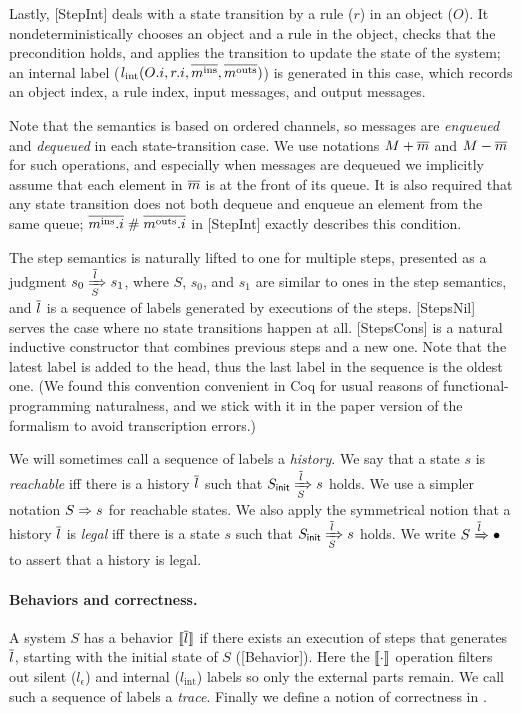 \documentclass[sigplan,10pt,review,anonymous,screen]{acmart}\settopmatter{printfolios=true,printccs=false,printacmref=false}
\begin{document}
Lastly, [StepInt] deals with a state transition by a rule ($r$) in an object ($O$).
It nondeterministically chooses an object and a rule in the object, checks that the precondition holds, and applies the transition to update the state of the system; an internal label ($\lblInt{\idxOf{O}}{\idxOf{r}}{\msgIns{m}}{\msgOuts{m}}$) is generated in this case, which records an object index, a rule index, input messages, and output messages.

Note that the semantics is based on ordered channels, so messages are \emph{enqueued} and \emph{dequeued} in each state-transition case.
We use notations $\enqMsgs{M}{\listof{m}}$ and $\deqMsgs{M}{\listof{m}}$ for such operations, and especially when messages are dequeued we implicitly assume that each element in $\listof{m}$ is at the front of its queue.
It is also required that any state transition does not both dequeue and enqueue an element from the same queue; $\disj{\midxIns{m}}{\midxOuts{m}}$ in [StepInt] exactly describes this condition.

The step semantics is naturally lifted to one for multiple steps, presented as a judgment $\semsteps{S}{s_0}{\listof{l}}{s_1}$, where $S$, $s_0$, and $s_1$ are similar to ones in the step semantics, and $\listof{l}$ is a sequence of labels generated by executions of the steps.
[StepsNil] serves the case where no state transitions happen at all.
[StepsCons] is a natural inductive constructor that combines previous steps and a new one.
Note that the latest label is added to the head, thus the last label in the sequence is the oldest one.
(We found this convention convenient in Coq for usual reasons of functional-programming naturalness, and we stick with it in the paper version of the formalism to avoid transcription errors.)

We will sometimes call a sequence of labels a \emph{history}.
We say that a state $s$ is \emph{reachable} iff there is a history $\listof{l}$ such that $\semsteps{S}{\sysInit{S}}{\listof{l}}{s}$ holds.
We use a simpler notation $\semrch{S}{s}$ for reachable states.
We also apply the symmetrical notion that a history $\listof{l}$ is \emph{legal} iff there is a state $s$ such that $\semsteps{S}{\sysInit{S}}{\listof{l}}{s}$ holds.
We write $\semleg{S}{\listof{l}}$ to assert that a history is legal.

\paragraph{Behaviors and correctness.}
A system $S$ has a behavior $\behOf{\listof{l}}$ if there exists an execution of steps that generates $\listof{l}$, starting with the initial state of $S$ ([Behavior]).
Here the $\behOf{\cdot}$ operation filters out silent ($l_\epsilon$) and internal ($l_{\textrm{int}}$) labels so only the external parts remain.
We call such a sequence of labels a \emph{trace}.
Finally we define a notion of correctness in \hemiola{}.
\end{document}
